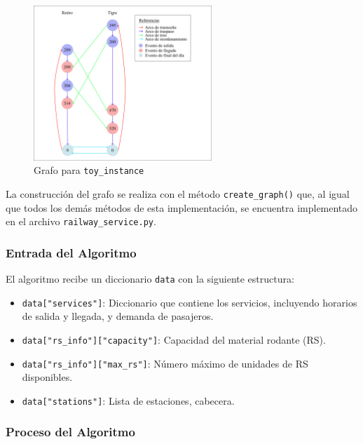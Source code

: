 \documentclass{article}
\begin{document}
\begin{figure}[H]
    \centering
    \includegraphics[width=0.60\textwidth]{esquema_toy_instance.png}
    \caption{Grafo para \texttt{toy\_instance}}
    \label{fig:ejemplo}
\end{figure}

La construcción del grafo se realiza con el método \texttt{create\_graph()} que, al igual que todos los demás métodos de esta implementación, se encuentra implementado en el archivo \texttt{railway\_service.py}. 

\subsubsection*{Entrada del Algoritmo}

El algoritmo recibe un diccionario \texttt{data} con la siguiente estructura:

\begin{itemize}
    \item \texttt{data["services"]}: Diccionario que contiene los servicios, incluyendo horarios de salida y llegada, y demanda de pasajeros.
    \item \texttt{data["rs\_info"]["capacity"]}: Capacidad del material rodante (RS).
    \item \texttt{data["rs\_info"]["max\_rs"]}: Número máximo de unidades de RS disponibles.
    \item \texttt{data["stations"]}: Lista de estaciones, cabecera.
\end{itemize}

\subsubsection*{Proceso del Algoritmo}
\end{document}
